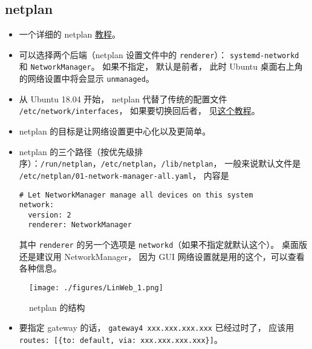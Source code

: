 \subsection{netplan}
\begin{itemize}
\item 一个详细的 netplan \href{https://linuxconfig.org/netplan-network-configuration-tutorial-for-beginners}{教程}。
\item 可以选择两个后端（netplan 设置文件中的 \verb|renderer|）： \verb|systemd-networkd| 和 \verb|NetworkManager|。 如果不指定， 默认是前者， 此时 Ubuntu 桌面右上角的网络设置中将会显示 \verb|unmanaged|。
\item 从 Ubuntu 18.04 开始， netplan 代替了传统的配置文件 \verb|/etc/network/interfaces|， 如果要切换回后者， 见\href{https://linuxconfig.org/how-to-switch-back-networking-to-etc-network-interfaces-on-ubuntu-20-04-focal-fossa-linux}{这个教程}。
\item netplan 的目标是让网络设置更中心化以及更简单。
\item netplan 的三个路径（按优先级排序）：\verb|/run/netplan|，\verb|/etc/netplan|，\verb|/lib/netplan|， 一般来说默认文件是 \verb|/etc/netplan/01-network-manager-all.yaml|， 内容是
\begin{lstlisting}[language=none]
# Let NetworkManager manage all devices on this system
network:
  version: 2
  renderer: NetworkManager
\end{lstlisting}
其中 \verb|renderer| 的另一个选项是 \verb|networkd|（如果不指定就默认这个）。 桌面版还是建议用 NetworkManager， 因为 GUI 网络设置就是用的这个，可以查看各种信息。
\end{itemize}

\begin{figure}[ht]
\centering
\texttt{[image: ./figures/LinWeb\_1.png]}
\caption{netplan 的结构} \label{LinWeb_fig1}
\end{figure}

\begin{itemize}
\item 要指定 gateway 的话， \verb|gateway4 xxx.xxx.xxx.xxx| 已经过时了， 应该用 \verb|routes: [{to: default, via: xxx.xxx.xxx.xxx}]|。
\end{itemize}


